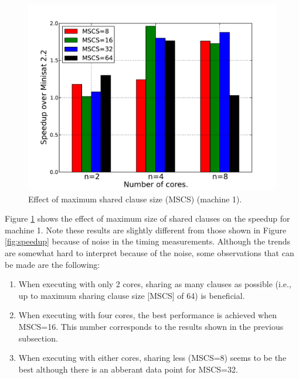 \documentclass[letterpaper, compsoc, conference]{IEEEtran}
\begin{document}
\begin{figure}[htbp]
    \begin{center}
        \includegraphics[width=\columnwidth]{images/mcs.pdf}
        \caption{Effect of maximum shared clause size (MSCS) (machine 1).}
        \label{fig:mscs}
    \end{center}
\end{figure}

Figure \ref{fig:mscs} shows the effect of maximum size of shared clauses on the
speedup for machine 1. Note these results are slightly different from those
shown in Figure \ref{fig:speedup} because of noise in the timing measurements.
Although the trends are somewhat hard to interpret because of the noise, some
observations that can be made are the following:

\begin{enumerate}

\item When executing with only 2 cores, sharing as many clauses as possible
(i.e., up to maximum sharing clause size [MSCS] of 64) is beneficial.

\item When executing with four cores, the best performance is achieved when
MSCS=16. This number corresponds to the results shown in the previous
subsection.

\item When executing with either cores, sharing less (MSCS=8) seems to be the
best although there is an abberant data point for MSCS=32.
      
\end{enumerate}
\end{document}
